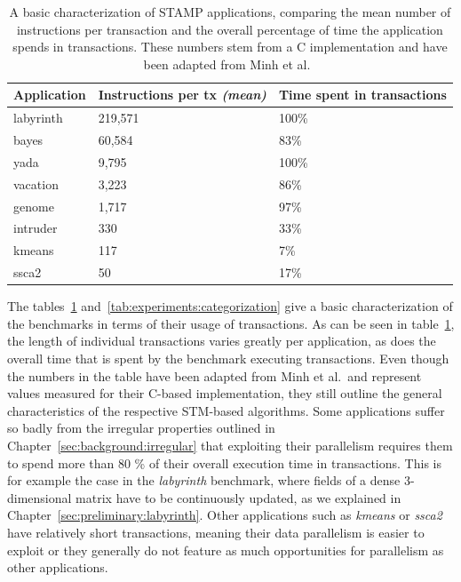 \begin{table}
    \centering
    \begin{tabular}{|l|l|l|}
        \hline
        \textbf{Application} & \textbf{Instructions per tx} \emph{(mean)} & \textbf{Time spent in transactions}\\\hline\hline
        labyrinth & 219,571 & 100\%\\\hline
        bayes & 60,584 & 83\%\\\hline
        yada & 9,795 & 100\%\\\hline
        vacation & 3,223 & 86\%\\\hline
        genome & 1,717 & 97\%\\\hline
        intruder & 330 & 33\%\\\hline
        kmeans & 117 & 7\%\\\hline
        ssca2 & 50 & 17\%\\\hline
    \end{tabular}
    \caption{A basic characterization of STAMP applications, comparing the mean number of instructions per transaction and the overall percentage of time the application spends in transactions. These numbers stem from a C implementation and have been adapted from Minh et al.~\cite{minh2008stamp}}
    \label{tab:experiments:overview}
\end{table}

The tables~\ref{tab:experiments:overview} and~\ref{tab:experiments:categorization} give a basic characterization of the benchmarks in terms of their usage of transactions.
As can be seen in table~\ref{tab:experiments:overview}, the length of individual transactions varies greatly per application, as does the overall time that is spent by the benchmark executing transactions.
Even though the numbers in the table have been adapted from Minh et al.\ and represent values measured for their C-based implementation, they still outline the general characteristics of the respective STM-based algorithms.
Some applications suffer so badly from the irregular properties outlined in Chapter~\ref{sec:background:irregular} that exploiting their parallelism requires them to spend more than 80 \% of their overall execution time in transactions.
This is for example the case in the \emph{labyrinth} benchmark, where fields of a dense 3-dimensional matrix have to be continuously updated, as we explained in Chapter~\ref{sec:preliminary:labyrinth}.
Other applications such as \emph{kmeans} or \emph{ssca2} have relatively short transactions, meaning their data parallelism is easier to exploit or they generally do not feature as much opportunities for parallelism as other applications.

